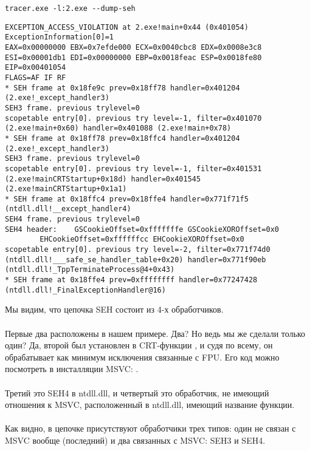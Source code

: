 \begin{lstlisting}
tracer.exe -l:2.exe --dump-seh
\end{lstlisting}

\begin{lstlisting}[caption=tracer.exe output]
EXCEPTION_ACCESS_VIOLATION at 2.exe!main+0x44 (0x401054) ExceptionInformation[0]=1
EAX=0x00000000 EBX=0x7efde000 ECX=0x0040cbc8 EDX=0x0008e3c8
ESI=0x00001db1 EDI=0x00000000 EBP=0x0018feac ESP=0x0018fe80
EIP=0x00401054
FLAGS=AF IF RF
* SEH frame at 0x18fe9c prev=0x18ff78 handler=0x401204 (2.exe!_except_handler3)
SEH3 frame. previous trylevel=0
scopetable entry[0]. previous try level=-1, filter=0x401070 (2.exe!main+0x60) handler=0x401088 (2.exe!main+0x78)
* SEH frame at 0x18ff78 prev=0x18ffc4 handler=0x401204 (2.exe!_except_handler3)
SEH3 frame. previous trylevel=0
scopetable entry[0]. previous try level=-1, filter=0x401531 (2.exe!mainCRTStartup+0x18d) handler=0x401545 (2.exe!mainCRTStartup+0x1a1)
* SEH frame at 0x18ffc4 prev=0x18ffe4 handler=0x771f71f5 (ntdll.dll!__except_handler4)
SEH4 frame. previous trylevel=0
SEH4 header:	GSCookieOffset=0xfffffffe GSCookieXOROffset=0x0
		EHCookieOffset=0xffffffcc EHCookieXOROffset=0x0
scopetable entry[0]. previous try level=-2, filter=0x771f74d0 (ntdll.dll!___safe_se_handler_table+0x20) handler=0x771f90eb (ntdll.dll!_TppTerminateProcess@4+0x43)
* SEH frame at 0x18ffe4 prev=0xffffffff handler=0x77247428 (ntdll.dll!_FinalExceptionHandler@16)
\end{lstlisting}

Мы видим, что цепочка SEH состоит из 4-х обработчиков.\\
\\
Первые два расположены в нашем примере. Два?
Но ведь мы же сделали только один?
Да, второй был установлен в \ac{CRT}-функции 
, и судя по всему, он обрабатывает как минимум исключения связанные с \ac{FPU}.
Его код можно посмотреть в инсталляции MSVC: .\\
\\
Третий это SEH4 в ntdll.dll, и четвертый это обработчик, не имеющий отношения к MSVC, расположенный в ntdll.dll, имеющий  название функции.\\
\\
Как видно, в цепочке присутствуют обработчики трех типов:
один не связан с MSVC вообще (последний) и два связанных с MSVC: SEH3 и SEH4.


